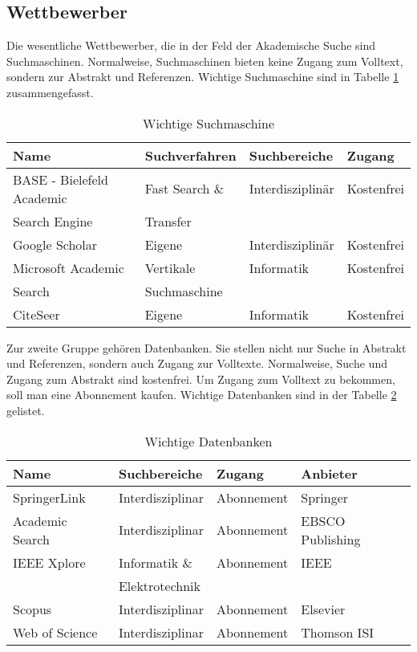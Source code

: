 \subsection{Wettbewerber}
Die wesentliche Wettbewerber, die in der Feld der Akademische Suche sind Suchmaschinen. Normalweise, Suchmaschinen bieten keine Zugang zum Volltext, sondern zur Abstrakt und Referenzen. Wichtige Suchmaschine sind in Tabelle \ref{tab:wettSuch} zusammengefasst.
\begin{table}[h!]
  \centering
  \begin{tabular}{|l|l|l|l|}\hline
   \textbf{Name} &  \textbf{Suchverfahren} &  \textbf{Suchbereiche} &   \textbf{Zugang} \\ \hline
BASE - Bielefeld Academic  & Fast Search \& & Interdisziplinär & Kostenfrei \\
Search Engine & Transfer  & & \\ \hline
 Google Scholar & Eigene & Interdisziplinär & Kostenfrei\\\hline
 Microsoft Academic & Vertikale & Informatik & Kostenfrei \\
 Search & Suchmaschine & & \\ \hline
 CiteSeer & Eigene & Informatik & Kostenfrei \\ \hline
  \end{tabular}
  \caption{Wichtige Suchmaschine}
  \label{tab:wettSuch}
\end{table} 
 
Zur zweite Gruppe gehören Datenbanken. Sie stellen nicht nur Suche in Abstrakt und Referenzen, sondern auch Zugang zur Volltexte. Normalweise, Suche und Zugang zum Abstrakt sind kostenfrei. Um Zugang zum Volltext zu bekommen, soll man eine Abonnement kaufen. Wichtige Datenbanken sind in der Tabelle \ref{tab:wettDaten} gelistet. 
\begin{table}[h!]
  \centering
  \begin{tabular}{|l|l|l|l|}\hline
  \textbf{Name} &  \textbf{Suchbereiche} &  \textbf{Zugang} &  \textbf{Anbieter} \\ \hline
 SpringerLink & Interdisziplinar & Abonnement & Springer\\ \hline
 Academic Search & Interdisziplinar & Abonnement & EBSCO Publishing\\ \hline
 IEEE Xplore & Informatik \& & Abonnement & IEEE\\ 
 & Elektrotechnik & & \\ \hline
 Scopus & Interdisziplinar & Abonnement & Elsevier\\ \hline
 Web of Science & Interdisziplinar & Abonnement & Thomson ISI \\ \hline
  \end{tabular} 
  \caption{Wichtige Datenbanken}
  \label{tab:wettDaten}
\end{table} 


